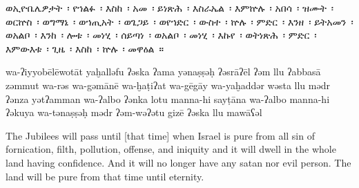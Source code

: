 
\begin{ethiopictext}
    ወኢዮቤሌዎታት~፡ የኀልፉ~፡ እስከ~፡ አመ~፡ ይነጽሕ~፡ እስራኤል~፡
    እምኵሉ~፡ አበሳ~፡ ዝሙት~፡ ወርኵስ~፡ ወግማኔ~፡ ወኀጢአት~፡ ወጌጋይ~፡ 
    ወየኀድር~፡ ውስተ~፡ ኵሉ~፡ ምድር~፡ እንዘ~፡ ይትአመን~፡ ወአልቦ~፡
    እንከ~፡ ሎቱ~፡ መነሂ~፡ ሰይጣነ~፡ ወአልቦ~፡ መነሂ~፡ እኩየ~፡ ወትነጽሕ~፡ 
    ምድር~፡ እምውእቱ~፡ ጊዜ~፡ እስከ~፡ ኵሉ~፡ መዋዕል~።
\end{ethiopictext}

\begin{transliteration}
    wa-ʔiyyobēlēwotāt yaḫalləfu ʔəska ʔama yənaṣṣəḥ ʔəsrāʔēl
    ʔəm llu ʔabbasā zəmmut wa-rə\kw{}s wa-gəmānē wa-ḫaṭiʔat wa-gēgāy
    wa-yaḫaddər wəsta llu mədr ʔənza yətʔamman wa-ʔalbo
    ʔənka lotu manna-hi sayṭāna wa-ʔalbo manna-hi ʔəkuya wa-tənaṣṣəḥ
    mədr ʔəm-wəʔətu gizē ʔəska llu mawāʕəl
\end{transliteration}

\begin{translation}
    The Jubilees will pass until [that time] when Israel is pure
    from all sin of fornication, filth, pollution, offense, and iniquity
    and it will dwell in the whole land having confidence. And it will no longer have
    any satan nor evil person. The land will be pure from that time until eternity.
\end{translation}